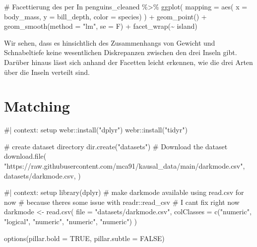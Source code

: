 \documentclass[
  a4paper,
  DIV=11,
  oneside]{scrreprt}
\newenvironment{Shaded}{\begin{snugshade}}{\end{snugshade}}
\newcommand{\NormalTok}[1]{\textcolor[rgb]{0.00,0.23,0.31}{#1}}
\begin{document}
\begin{Shaded}
\begin{Highlighting}[]
\NormalTok{\# Facettierung des per In}
\NormalTok{penguins\_cleaned \%\textgreater{}\%}
\NormalTok{  ggplot(}
\NormalTok{    mapping = aes(}
\NormalTok{      x = body\_mass, }
\NormalTok{      y = bill\_depth, }
\NormalTok{      color = species)}
\NormalTok{  ) +}
\NormalTok{  geom\_point() +}
\NormalTok{  geom\_smooth(method = "lm", se = F) +}
\NormalTok{  facet\_wrap(\textasciitilde{} island)}
\end{Highlighting}
\end{Shaded}

Wir sehen, dass es hinsichtlich des Zusammenhangs von Gewicht und
Schnabeltiefe keine wesentlichen Diskrepanzen zwischen den drei Inseln
gibt. Darüber hinaus lässt sich anhand der Facetten leicht erkennen, wie
die drei Arten über die Inseln verteilt sind.


\hypertarget{matching}{%
\chapter{Matching}\label{matching}}

\begin{Shaded}
\begin{Highlighting}[]
\NormalTok{\#| context: setup}
\NormalTok{webr::install("dplyr")}
\NormalTok{webr::install("tidyr")}

\NormalTok{\# create dataset directory}
\NormalTok{dir.create("datasets")}
\NormalTok{\# Download the dataset}
\NormalTok{download.file(}
\NormalTok{    "https://raw.githubusercontent.com/mca91/kausal\_data/main/darkmode.csv",}
\NormalTok{    \textquotesingle{}datasets/darkmode.csv\textquotesingle{},}
\NormalTok{)}
\end{Highlighting}
\end{Shaded}

\begin{Shaded}
\begin{Highlighting}[]
\NormalTok{\#| context: setup}
\NormalTok{library(dplyr)}
\NormalTok{\# make darkmode available using read.csv for now}
\NormalTok{\# because there\textquotesingle{}s some issue with readr::read\_csv}
\NormalTok{\# I can\textquotesingle{}t fix right now}
\NormalTok{darkmode \textless{}{-} read.csv(}
\NormalTok{    file = "datasets/darkmode.csv", }
\NormalTok{    colClasses = c("numeric", "logical", "numeric", "numeric", "numeric") }
\NormalTok{)}

\NormalTok{options(pillar.bold = TRUE, pillar.subtle = FALSE)}
\end{Highlighting}
\end{Shaded}
\end{document}
